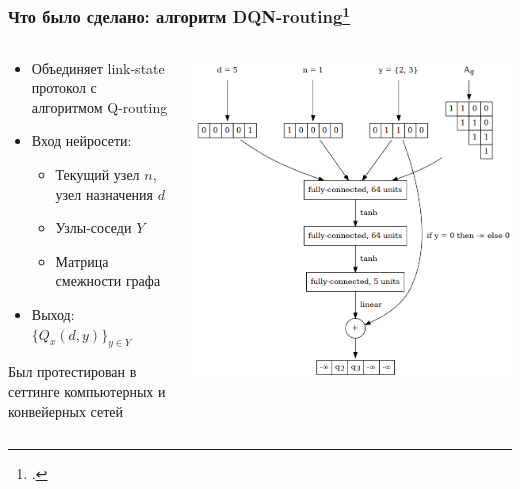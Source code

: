 \documentclass{beamer}
\begin{document}
\begin{frame}
  \frametitle{Что было сделано: алгоритм DQN-routing\footcite{mukhutdinov2019multi}}
  \begin{columns}
    \begin{column}{0.6\textwidth}
      \begin{itemize}
      \item Объединяет link-state протокол с алгоритмом Q-routing
      \item Вход нейросети:
        \begin{itemize}
        \item Текущий узел $n$, узел назначения $d$
        \item Узлы-соседи $Y$
        \item Матрица смежности графа
        \end{itemize}
      \item Выход: $\{ Q_x(d, y) \}_{y \in Y}$
      \end{itemize}
      Был протестирован в сеттинге компьютерных и конвейерных сетей
    \end{column}
    \begin{column}{0.4\textwidth}
      \begin{center}
        \includegraphics[width=\textwidth]{nn-2}
      \end{center}
    \end{column}
  \end{columns}
\end{frame}
\end{document}
